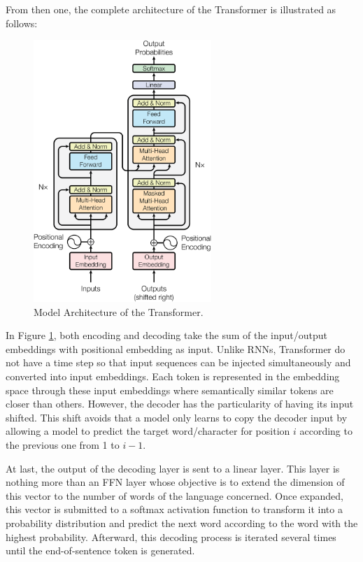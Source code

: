 From then one, the complete architecture of the Transformer is illustrated as follows:
\begin{figure}[!ht]
  \centering
  \includegraphics[width=0.6\textwidth]{img/transformer/architecture}
  \caption{Model Architecture of the Transformer.}
  \label{fig:transformer:architecture}
\end{figure}

\newpage

In Figure \ref{fig:transformer:architecture}, both encoding and decoding take
the sum of the input/output embeddings with positional embedding as
input. Unlike RNNs, Transformer do not have a time step so that input sequences
can be injected simultaneously and converted into input embeddings. Each token
is represented in the embedding space through these input embeddings where
semantically similar tokens are closer than others. However, the decoder has the
particularity of having its input shifted. This shift avoids that a model only
learns to copy the decoder input by allowing a model to predict the target
word/character for position $i$ according to the previous one from 1 to $i-1$.

At last, the output of the decoding layer is sent to a linear layer. This layer
is nothing more than an FFN layer whose objective is to extend the dimension of
this vector to the number of words of the language concerned. Once expanded,
this vector is submitted to a softmax activation function to transform it into a
probability distribution and predict the next word according to the word with
the highest probability. Afterward, this decoding process is iterated several
times until the end-of-sentence token is generated.

